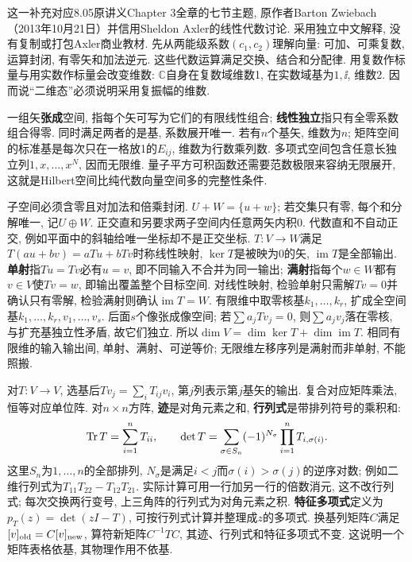 这一补充对应8.05原讲义Chapter 3全章的七节主题, 原作者Barton Zwiebach（2013年10月21日）并信用Sheldon Axler的线性代数讨论. 采用独立中文解释, 没有复制或打包Axler商业教材. 先从两能级系数$(c_1,c_2)$理解向量: 可加、可乘复数, 运算封闭, 有零矢和加法逆元. 这些代数运算满足交换、结合和分配律. 用复数作标量与用实数作标量会改变维数: $\mathbb C$自身在复数域维数1, 在实数域基为$1,\ii$, 维数2. 因而说“二维态”必须说明采用复振幅的维数.

一组矢\textbf{张成}空间, 指每个矢可写为它们的有限线性组合; \textbf{线性独立}指只有全零系数组合得零. 同时满足两者的是基, 系数展开唯一. 若有$n$个基矢, 维数为$n$; 矩阵空间的标准基是每次只在一格放1的$E_{ij}$, 维数为行数乘列数. 多项式空间包含任意长独立列$1,x,\ldots,x^N$, 因而无限维. 量子平方可积函数还需要范数极限来容纳无限展开, 这就是Hilbert空间比纯代数向量空间多的完整性条件.

子空间必须含零且对加法和倍乘封闭. $U+W=\{u+w\}$; 若交集只有零, 每个和分解唯一, 记$U\oplus W$. 正交直和另要求两子空间内任意两矢内积0. 代数直和不自动正交, 例如平面中的斜轴给唯一坐标却不是正交坐标.
$T:V\to W$满足$T(au+bv)=aTu+bTv$时称线性映射, $\ker T$是被映为0的矢, $\operatorname{im}T$是全部输出. \textbf{单射}指$Tu=Tv$必有$u=v$, 即不同输入不合并为同一输出; \textbf{满射}指每个$w\in W$都有$v\in V$使$Tv=w$, 即输出覆盖整个目标空间. 对线性映射, 检验单射只需解$Tv=0$并确认只有零解, 检验满射则确认$\operatorname{im}T=W$. 有限维中取零核基$k_1,\ldots,k_r$, 扩成全空间基$k_1,\ldots,k_r,v_1,\ldots,v_s$. 后面$s$个像张成像空间; 若$\sum a_jTv_j=0$, 则$\sum a_jv_j$落在零核, 与扩充基独立性矛盾, 故它们独立. 所以$\dim V=\dim\ker T+\dim\operatorname{im}T$. 相同有限维的输入输出间, 单射、满射、可逆等价; 无限维左移序列是满射而非单射, 不能照搬.

对$T:V\to V$, 选基后$Tv_j=\sum_iT_{ij}v_i$, 第$j$列表示第$j$基矢的输出. 复合对应矩阵乘法, 恒等对应单位阵. 对$n\times n$方阵, \textbf{迹}是对角元素之和, \textbf{行列式}是带排列符号的乘积和:
\[
 \operatorname{Tr} T=\sum_{i=1}^nT_{ii},\qquad
 \det T=\sum_{\sigma\in S_n}(-1)^{N_\sigma}\prod_{i=1}^nT_{i,\sigma(i)}.
\]
这里$S_n$为$1,\ldots,n$的全部排列, $N_\sigma$是满足$i<j$而$\sigma(i)>\sigma(j)$的逆序对数; 例如二维行列式为$T_{11}T_{22}-T_{12}T_{21}$. 实际计算可用一行加另一行的倍数消元, 这不改行列式; 每次交换两行变号, 上三角阵的行列式为对角元素之积. \textbf{特征多项式}定义为$p_T(z)=\det(zI-T)$, 可按行列式计算并整理成$z$的多项式. 换基列矩阵$C$满足$[v]_{\rm old}=C[v]_{\rm new}$, 算符新矩阵$C^{-1}TC$, 其迹、行列式和特征多项式不变. 这说明一个矩阵表格依基, 其物理作用不依基.

